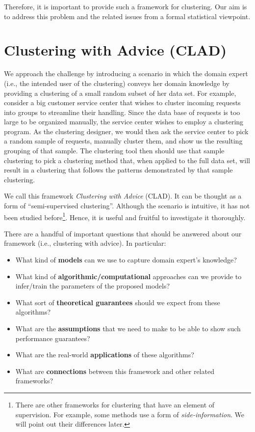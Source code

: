 \documentclass[letterpaper,12pt,titlepage,oneside,final]{book}
\begin{document}
Therefore, it is important to provide such a framework for clustering. Our aim is to address this problem and the related issues from a formal statistical viewpoint.


\section{Clustering with Advice (CLAD)}


We approach the challenge by introducing a scenario in which the domain expert (i.e., the intended user of the clustering) conveys her domain knowledge by providing a clustering of a small random subset of her data set. For example, consider a big customer service center that wishes to cluster incoming requests into groups to streamline their handling. Since the data base of requests is too large to be organized manually, the service center wishes to employ a clustering program. As the clustering designer, we would then ask the service center to pick a random sample of requests, manually cluster them, and show us the resulting grouping of that sample.  
The clustering tool then should use that sample clustering to pick a clustering method that, when applied to the full data set, will result in a clustering that follows the patterns demonstrated by that sample clustering.

We call this framework \emph{Clustering with Advice} (CLAD). It can be thought as a form of ``semi-supervised clustering''. Although the scenario is intuitive, it has not been studied before\footnote{There are other frameworks for clustering that have an element of supervision. For example, some methods use a form of \emph{side-information}. We will point out their differences later.}. Hence, it is useful and fruitful to investigate it thoroughly.

There are a handful of important questions that should be answered about our framework (i.e., clustering with advice). In particular: 

\begin{itemize}

\item What kind of {\bf models} can we use to capture domain expert's knowledge?

\item What kind of {\bf algorithmic/computational} approaches can we provide to infer/train the parameters of the proposed models?

\item What sort of {\bf theoretical guarantees} should we expect from these algorithms?

\item What are the {\bf assumptions} that we need to make to be able to show such performance guarantees?

\item What are the real-world {\bf applications} of these algorithms?

\item What are {\bf connections} between this framework and other related frameworks?


\end{itemize}
\end{document}
